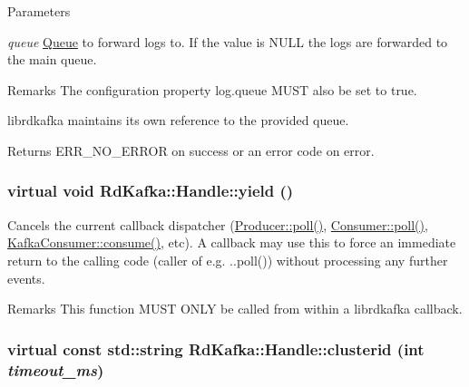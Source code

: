 \begin{DoxyParams}{Parameters}
\item[{\em queue}]\hyperlink{classRdKafka_1_1Queue}{Queue} to forward logs to. If the value is NULL the logs are forwarded to the main queue.\end{DoxyParams}
\begin{DoxyRemark}{Remarks}
The configuration property {\ttfamily log.queue} MUST also be set to true.

librdkafka maintains its own reference to the provided queue.
\end{DoxyRemark}
\begin{DoxyReturn}{Returns}
ERR\_\-NO\_\-ERROR on success or an error code on error. 
\end{DoxyReturn}
\hypertarget{classRdKafka_1_1Handle_a6143b8e8bbcf4bba23a687dc55ee55a3}{
\subsubsection[{yield}]{\setlength{\rightskip}{0pt plus 5cm}virtual void RdKafka::Handle::yield ()}}
\label{classRdKafka_1_1Handle_a6143b8e8bbcf4bba23a687dc55ee55a3}


Cancels the current callback dispatcher (\hyperlink{classRdKafka_1_1Handle_a98d3b4ee48457ff13e4d5155e3fc5ea4}{Producer::poll()}, \hyperlink{classRdKafka_1_1Handle_a98d3b4ee48457ff13e4d5155e3fc5ea4}{Consumer::poll()}, \hyperlink{classRdKafka_1_1KafkaConsumer_a7dc106f1c3b99767a0930a9cf8cabf84}{KafkaConsumer::consume()}, etc). A callback may use this to force an immediate return to the calling code (caller of e.g. ..poll()) without processing any further events.

\begin{DoxyRemark}{Remarks}
This function MUST ONLY be called from within a librdkafka callback. 
\end{DoxyRemark}
\hypertarget{classRdKafka_1_1Handle_a4c275b13ff80c40c05a2284b1e8764f1}{
\subsubsection[{clusterid}]{\setlength{\rightskip}{0pt plus 5cm}virtual const std::string RdKafka::Handle::clusterid (int {\em timeout\_\-ms})}}
\label{classRdKafka_1_1Handle_a4c275b13ff80c40c05a2284b1e8764f1}


